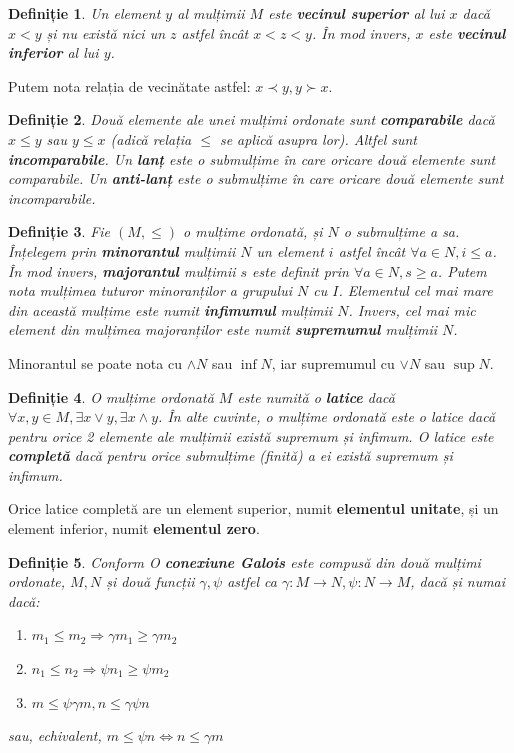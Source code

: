 \documentclass[12pt, a4paper, twoside, romanian]{teza-upb}
\newtheorem{defn}{Definiție}
\begin{document}
    \begin{defn}
      Un element $y$ al mulțimii $M$ este \textbf{vecinul superior} al lui $x$ dacă $x < y$ și nu există nici un $z$ astfel încât $x < z < y$. În mod invers, $x$ este \textbf{vecinul inferior} al lui $y$.
    \end{defn}

    Putem nota relația de vecinătate astfel: $x \prec y, y \succ x$.

    \begin{defn}
      Două elemente ale unei mulțimi ordonate sunt \textbf{comparabile} dacă $x \le y$ sau $y \le x$ (adică relația $\le$ se aplică asupra lor). Altfel sunt \textbf{incomparabile}. Un \textbf{lanț} este o submulțime în care oricare două elemente sunt comparabile. Un \textbf{anti-lanț} este o submulțime în care oricare două elemente sunt incomparabile.
    \end{defn}

    \begin{defn}
      Fie $(M, \le)$ o mulțime ordonată, și $N$ o submulțime a sa. Înțelegem prin \textbf{minorantul} mulțimii $N$ un element $i$ astfel încât $\forall a \in N, i \le a$. În mod invers, \textbf{majorantul} mulțimii $s$ este definit prin $\forall a \in N, s \ge a$.
      Putem nota mulțimea tuturor minoranților a grupului $N$ cu $I$. Elementul cel mai mare din această mulțime este numit \textbf{infimumul} mulțimii $N$. Invers, cel mai mic element din mulțimea majoranților este numit \textbf{supremumul} mulțimii $N$.
    \end{defn}

    Minorantul se poate nota cu $\wedge N$ sau $\inf N$, iar supremumul cu $\vee N$ sau $\sup N$.

    \begin{defn}
      O mulțime ordonată $M$ este numită o \textbf{latice} dacă $\forall x,y \in M, \exists x \vee y, \exists x \wedge y$. În alte cuvinte, o mulțime ordonată este o latice dacă pentru orice 2 elemente ale mulțimii există supremum și infimum. O latice este \textbf{completă} dacă pentru orice submulțime (finită) a ei există supremum și infimum.
    \end{defn}

    Orice latice completă are un element superior, numit \textbf{elementul unitate}, și un element inferior, numit \textbf{elementul zero}.

    \begin{defn}
      Conform \cite{Carpineto:2004:CDA:975252} O \textbf{conexiune Galois} este compusă din două mulțimi ordonate, $M, N$ și două funcții $\gamma, \psi$ astfel ca $ \gamma: M \rightarrow N, \psi : N \rightarrow M$, dacă și numai dacă:
    \begin{enumerate}
      \item $m_1 \le m_2 \Rightarrow  \gamma m_1 \ge \gamma m_2$
      \item $n_1 \le n_2 \Rightarrow \psi n_1 \ge \psi m_2$
      \item $m \le \psi \gamma m,  n \le \gamma\psi n $
    \end{enumerate}
    sau, echivalent, $m \le \psi n \Leftrightarrow n \le \gamma m$
    \end{defn}
\end{document}
